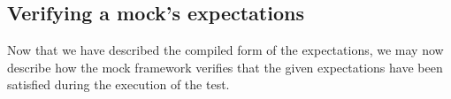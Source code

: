 





\subsection{Verifying a mock's expectations}
\label{application:mock_verification}

Now that we have described the compiled form of the expectations, we
may now describe how the mock framework verifies that the given
expectations have been satisfied during the execution of the test.

